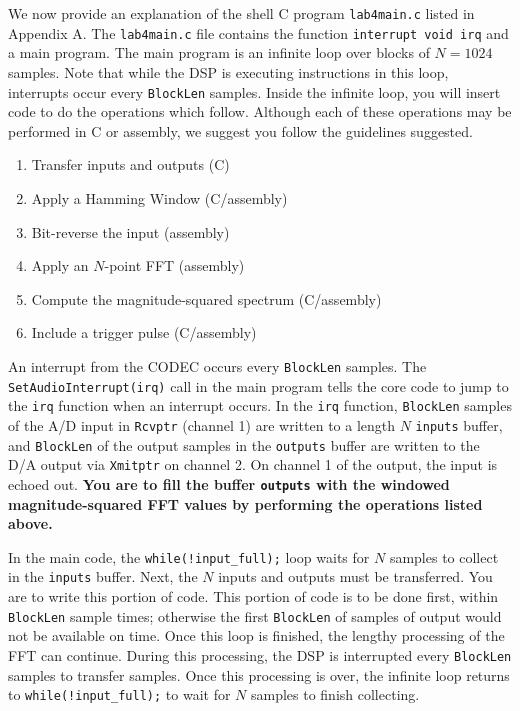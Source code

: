 We now provide an explanation of the shell C program 
\verb+lab4main.c+ listed in Appendix A.  The 
\verb+lab4main.c+ file contains the function 
\verb+interrupt void irq+ and a main program.  The main 
program is an infinite loop over blocks of $N=1024$ 
samples.  Note that while the DSP is executing instructions in
this loop, interrupts occur every \verb+BlockLen+ samples.  
Inside the infinite loop, you will insert 
code to do the operations which follow. 
Although each of these operations may be performed in C or 
assembly, we suggest you follow the guidelines suggested.
\begin{enumerate}
   \item{Transfer inputs and outputs (C)}
   \item{Apply a Hamming Window (C/assembly)}
   \item{Bit-reverse the input (assembly)}
   \item{Apply an $N$-point FFT (assembly)}
   \item{Compute the magnitude-squared spectrum (C/assembly)}
   \item{Include a trigger pulse (C/assembly)}
\end{enumerate}

An interrupt from the CODEC occurs every \verb+BlockLen+ samples.  The 
\verb+SetAudioInterrupt(irq)+ call in the main program tells 
the core code to jump to the \verb+irq+ function when an 
interrupt occurs.  In the \verb+irq+ function, \verb+BlockLen+ 
samples of the A/D input in \verb+Rcvptr+ (channel 1) are written 
to a length $N$ \verb+inputs+ buffer, and \verb+BlockLen+ of the 
output samples in the \verb+outputs+ buffer are written to 
the D/A output via \verb+Xmitptr+ on channel 2.  On channel 1 
of the output, the input is echoed out.  {\bf You are to fill 
the buffer \verb+outputs+ with the windowed magnitude-squared 
FFT values by performing the operations listed above.}

In the main code, the \verb+while(!input_full);+ loop waits for 
$N$ samples to collect in the \verb+inputs+ buffer.  Next, 
the $N$ inputs and outputs must be transferred.  You are to 
write this portion of code.  This portion of code is to be done 
first, within \verb+BlockLen+ sample times; otherwise the first 
\verb+BlockLen+ of samples of output would not be available 
on time.  Once this loop is finished, the lengthy processing of the 
FFT can continue.  During this processing, the DSP is interrupted 
every \verb+BlockLen+ samples to transfer samples.  Once this 
processing is over, the infinite loop returns to 
\verb+while(!input_full);+ to wait for $N$ samples to finish 
collecting.

